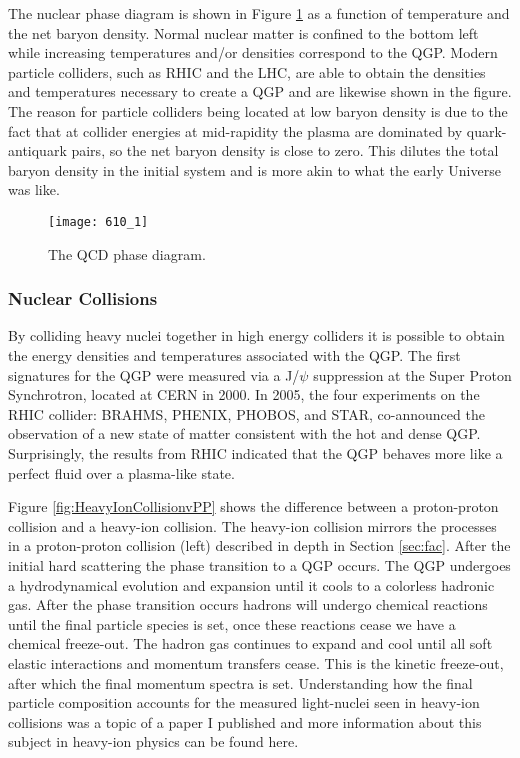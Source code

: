 The nuclear phase diagram is shown in Figure \ref{fig:QCDphase} as a function of temperature and the net baryon density.  Normal nuclear matter is confined to the bottom left while increasing temperatures and/or densities correspond to the QGP.  Modern particle colliders, such as RHIC and the LHC, are able to obtain the densities and temperatures necessary to create a QGP and are likewise shown in the figure.  The reason for particle colliders being located at low baryon density is due to the fact that at collider energies at mid-rapidity the plasma are dominated by quark-antiquark pairs, so the net baryon density is close to zero.  This dilutes the total baryon density in the initial system and is more akin to what the early Universe was like.  



\begin{figure}[h]
\texttt{[image: 610\_1]}
\centering
\caption{The QCD phase diagram\cite{Mohanty:2013yca}.}
\label{fig:QCDphase}
\end{figure}

\subsubsection{Nuclear Collisions}
By colliding heavy nuclei together in high energy colliders it is possible to obtain the energy densities and temperatures associated with the QGP.  The first signatures for the QGP were measured via a J/$\psi$ suppression at the Super Proton Synchrotron, located at CERN in 2000\cite{Csorgo:2000yu}.  In 2005, the four experiments on the RHIC collider: BRAHMS\cite{Arsene:2004fa}, PHENIX\cite{Adcox2005184}, PHOBOS\cite{Back200528}, and STAR\cite{Adams2005102}, co-announced the observation of a new state of matter consistent with the hot and dense QGP.  Surprisingly, the results from RHIC indicated that the QGP behaves more like a perfect fluid over a plasma-like state\cite{Jacak310}.

Figure \ref{fig:HeavyIonCollisionvPP} shows the difference between a proton-proton collision and a heavy-ion collision.  The heavy-ion collision mirrors the processes in a proton-proton collision (left) described in depth in Section \ref{sec:fac}.  After the initial hard scattering the phase transition to a QGP occurs.  The QGP undergoes a hydrodynamical evolution and expansion until it cools to a colorless hadronic gas.  After the phase transition occurs  hadrons will undergo chemical reactions until the final particle species is set, once these reactions cease we have a chemical freeze-out. The hadron gas continues to expand and cool until all soft elastic interactions and momentum transfers cease.  This is the kinetic freeze-out, after which the final momentum spectra is set.  Understanding how the final particle composition accounts for the measured light-nuclei seen in heavy-ion collisions was a topic of a paper I published and more information about this subject in heavy-ion physics can be found here\cite{Sharma:2018dyb}.

